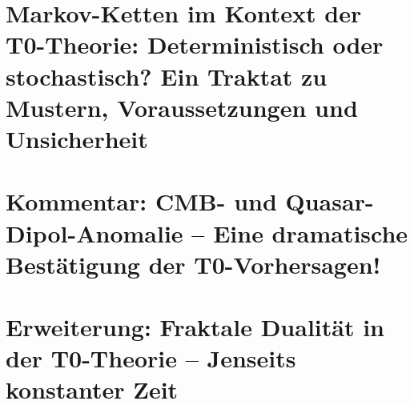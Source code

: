 \documentclass[11pt,oneside]{book}
\begin{document}
	\chapter{Markov-Ketten im Kontext der T0-Theorie: Deterministisch oder stochastisch? Ein Traktat zu Mustern, Voraussetzungen und Unsicherheit}
	
	
	\chapter{Kommentar: CMB- und Quasar-Dipol-Anomalie -- Eine dramatische Bestätigung der T0-Vorhersagen!}
	
	
	\chapter{Erweiterung: Fraktale Dualität in der T0-Theorie – Jenseits konstanter Zeit}
	
	
\end{document}
